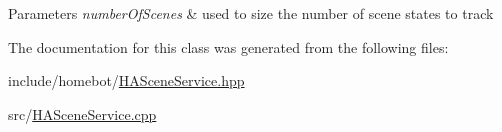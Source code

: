 \begin{DoxyParams}{Parameters}
{\em number\-Of\-Scenes} & used to size the number of scene states to track \\
\hline
\end{DoxyParams}


The documentation for this class was generated from the following files\-:\begin{DoxyCompactItemize}
\item 
include/homebot/\hyperlink{HASceneService_8hpp}{H\-A\-Scene\-Service.\-hpp}\item 
src/\hyperlink{HASceneService_8cpp}{H\-A\-Scene\-Service.\-cpp}\end{DoxyCompactItemize}
